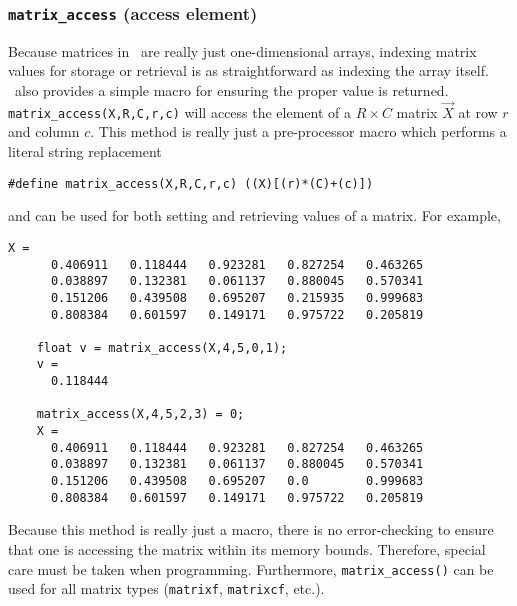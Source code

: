 \subsubsection{{\tt matrix\_access} (access element)}
\label{module:matrix:access}
Because matrices in \liquid\ are really just one-dimensional arrays, indexing
matrix values for storage or retrieval is as straightforward as indexing the
array itself.
\liquid\ also provides a simple macro for ensuring the proper value is
returned.
{\tt matrix\_access(X,R,C,r,c)} will access the element of a $R \times C$
matrix $\vec{X}$ at row $r$ and column $c$.
This method is really just a pre-processor macro which performs a literal
string replacement
\begin{Verbatim}[fontsize=\small]
  #define matrix_access(X,R,C,r,c) ((X)[(r)*(C)+(c)])
\end{Verbatim}
and can be used for both setting and retrieving values of a matrix.
For example,
\begin{Verbatim}[fontsize=\small]
    X = 
      0.406911   0.118444   0.923281   0.827254   0.463265
      0.038897   0.132381   0.061137   0.880045   0.570341
      0.151206   0.439508   0.695207   0.215935   0.999683
      0.808384   0.601597   0.149171   0.975722   0.205819

    float v = matrix_access(X,4,5,0,1);
    v =
      0.118444

    matrix_access(X,4,5,2,3) = 0;
    X =
      0.406911   0.118444   0.923281   0.827254   0.463265
      0.038897   0.132381   0.061137   0.880045   0.570341
      0.151206   0.439508   0.695207   0.0        0.999683
      0.808384   0.601597   0.149171   0.975722   0.205819
\end{Verbatim}
Because this method is really just a macro, there is no error-checking to
ensure that one is accessing the matrix within its memory bounds.
Therefore, special care must be taken when programming.
Furthermore, {\tt matrix\_access()} can be used for all matrix types
({\tt matrixf}, {\tt matrixcf}, etc.).

